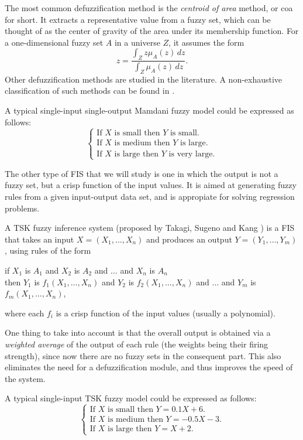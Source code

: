 The most common defuzzification method is the \textit{centroid of area} method, or \acrshort{coa} for short. It extracts a representative value from a fuzzy set, which can be thought of as the center of gravity of the area under its membership function. For a one-dimensional fuzzy set $A$ in a universe $Z$, it assumes the form
\[
z = \frac{\int_Z z\mu_A(z)\, dz}{\int_Z \mu_A(z)\, dz}.
\]
Other defuzzification methods are studied in the literature. A non-exhaustive classification of such methods can be found in \cite{leekwijck1999defuzzification}.

\begin{example}
  A typical single-input single-output Mamdani fuzzy model could be expressed as follows:
  \[
  \left\{ \begin{array}{l}
	\text{If $X$ is small then $Y$ is small}.\\
  \text{If $X$ is medium then $Y$ is large}.\\
	\text{If $X$ is large then $Y$ is very large}.
\end{array}\right.
\]
\end{example}

The other type of FIS that we will study is one in which the output is not a fuzzy set, but a crisp function of the input values. It is aimed at generating fuzzy rules from a given input-output data set, and is appropiate for solving regression problems.

\begin{definition} A TSK fuzzy inference system (proposed by Takagi, Sugeno and Kang \cite{takagi1985identification, sugeno1988structure}) is a FIS that takes an input $X=(X_1,\dots,X_n)$ and produces an output $Y = (Y_1, \dots, Y_m)$, using rules of the form
\begin{center}
  if $X_1$ is $A_1$ and $X_2$ is $A_2$ and $\dots$ and $X_n$ is $A_n$\\
  then $Y_1$ is $f_1(X_1, \dots, X_n)$ and $Y_2$ is $f_2(X_1, \dots, X_n)$ and $\dots$ and $Y_m$ is $f_m(X_1, \dots, X_n)$,
\end{center}
where each $f_i$ is a crisp function of the input values (usually a polynomial).
\end{definition}

One thing to take into account is that the overall output is obtained via a \textit{weighted average} of the output of each rule (the weights being their firing strength), since now there are no fuzzy sets in the consequent part. This also eliminates the need for a defuzzification module, and thus improves the speed of the system.

\begin{example}
  A typical single-input TSK fuzzy model could be expressed as follows:
  \[
  \left\{ \begin{array}{l}
	\text{If $X$ is small then $Y=0.1X + 6$}.\\
  \text{If $X$ is medium then $Y=-0.5X -3$}.\\
	\text{If $X$ is large then $Y=X+2$}.
\end{array}\right.
\]
\end{example}
